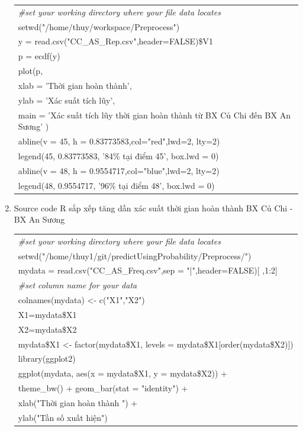 \documentclass[a4paper, 13pt]{report}
\begin{document}
\begin{enumerate}
\begin{flushleft}
\begin{tabular}{ |l| }
\hline
\textit{\#set your working directory where your file data locates}\\
setwd("/home/thuy/workspace/Preprocess")\\
y = read.csv("CC\_AS\_Rep.csv",header=FALSE)\$V1\\
p = ecdf(y)\\
plot(p,\\
\hspace{1cm} xlab = 'Thời gian hoàn thành', \\
\hspace{1cm} ylab = 'Xác suất tích lũy', \\
\hspace{1cm} main = 'Xác suất tích lũy thời gian hoàn thành từ BX Củ Chi đến BX An Sương'
)\\
abline(v = 45, h = 0.83773583,col="red",lwd=2, lty=2)\\
legend(45, 0.83773583, '84\% tại điểm 45', box.lwd = 0)\\
abline(v = 48, h = 0.9554717,col="blue",lwd=2, lty=2)\\
legend(48, 0.9554717, '96\% tại điểm 48', box.lwd = 0)\\ 
\hline
\end{tabular}
\end{flushleft}
\item Source code R sắp xếp tăng dần xác suất thời gian hoàn thành BX Củ Chi - BX An Sương\\
\begin{flushleft}
\begin{tabular}{ |l| }
\hline
\textit{\#set your working directory where your file data locates}\\
setwd("/home/thuy1/git/predictUsingProbability/Preprocess/")\\
mydata = read.csv("CC\_AS\_Freq.csv",sep = "|",header=FALSE)[ ,1:2]\\
\textit{\#set column name for your data}\\
colnames(mydata) <- c("X1","X2")\\
X1=mydata\$X1\\
X2=mydata\$X2\\
mydata\$X1 <- factor(mydata\$X1, levels = mydata\$X1[order(mydata\$X2)])\\
library(ggplot2)\\
ggplot(mydata, aes(x = mydata\$X1, y = mydata\$X2)) +\\
\hspace{1cm} theme\_bw() + geom\_bar(stat = "identity") + \\
\hspace{1cm} xlab("Thời gian hoàn thành ") +\\
\hspace{1cm} ylab("Tần số xuất hiện") \\
\hline
\end{tabular}
\end{flushleft}



\end{enumerate}
\end{document}
